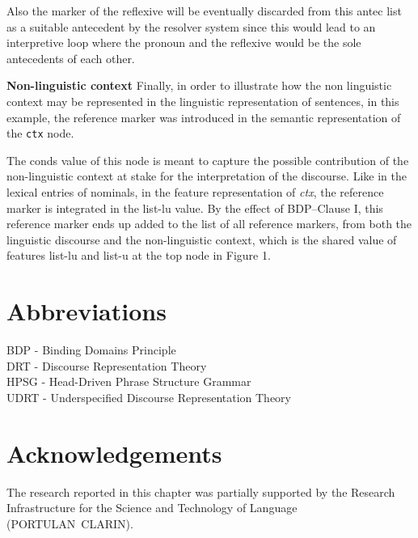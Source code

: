 \documentclass[output=paper
	        ,collection
	        ,collectionchapter
 	        ,biblatex
                ,babelshorthands
                ,newtxmath
                ,draftmode
                ,colorlinks, citecolor=brown
]{langscibook}
\begin{document}
\begin{paperappendix}
Also the marker 
of the reflexive
will be eventually discarded from this {\sc antec} list as a suitable antecedent by the resolver system
since this would lead to an interpretive loop where the pronoun and the
reflexive would be the sole antecedents of each other.

\textbf{Non-linguistic context} Finally, in order to illustrate how the non linguistic context may be represented 
in the linguistic representation of sentences, 
in this example, the reference marker  
was introduced in the semantic representation of the \texttt{ctx} node. 

The {\sc conds} value of this node is meant to capture the possible contribution 
of the non-linguistic context at stake for the interpretation of the discourse. 
Like in the lexical entries of nominals, in the feature representation of {\em ctx},
the reference marker 
is integrated in the {\sc list-lu} value.
By the effect of BDP--Clause I, this reference marker ends up added to the list of 
all reference markers, from both the linguistic discourse and the non-linguistic
context, which is the shared value of features {\sc list-lu} and {\sc list-u} at the top node in Figure 1.

\end{paperappendix}


\section*{Abbreviations}

BDP - Binding Domains Principle\\
DRT - Discourse Representation Theory\\
HPSG - Head-Driven Phrase Structure Grammar\\
UDRT - Underspecified Discourse Representation Theory

\section*{Acknowledgements}

The research reported in this chapter was partially supported by the 
Research Infrastructure  for  the Science  and  Technology of Language (\mbox{PORTULAN CLARIN}).


{\sloppy
\printbibliography[heading=subbibliography,notkeyword=this]
}
\end{document}
